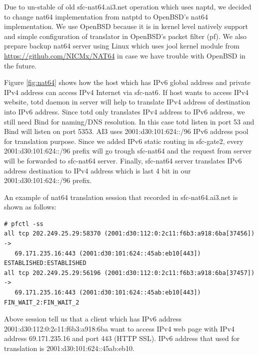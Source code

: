 \documentclass{article}
\begin{document}
Due to un-stable of old sfc-nat64.ai3.net operation which uses naptd, we decided to change nat64 implementation from natptd to OpenBSD's nat64 implementation.  
We use OpenBSD because it is in kernel level natively support and simple configuration of translator in OpenBSD's packet filter (pf).
We also prepare backup nat64 server using Linux which uses jool kernel module from \url{https://github.com/NICMx/NAT64} in case we have trouble with OpenBSD in the future. 

Figure \ref{fig:nat64} shows how the host which has IPv6 global address and private IPv4 address can access IPv4 Internet via sfc-nat6. 
If host wants to access IPv4 website, totd daemon in server will help to translate IPv4 address of destination into IPv6 address. 
Since totd only translates IPv4 address to IPv6 address, we still need Bind for naming/DNS resolution. 
In this case totd listen in port 53 and Bind will listen on port 5353. 
AI3 uses 2001:d30:101:624::/96 IPv6 address pool for translation purpose.  
Since we added IPv6 static routing in sfc-gate2, every 2001:d30:101:624::/96 prefix will go trough sfc-nat64 and the request from server will be forwarded to sfc-nat64 server. 
Finally, sfc-nat64 server translates IPv6 address destination to IPv4 address which is last 4 bit in our  2001:d30:101:624::/96 prefix.   

An example of nat64 translation session that recorded in sfc-nat64.ai3.net is shown as follows:  
\begin{verbatim}
# pfctl -ss     
all tcp 202.249.25.29:58370 (2001:d30:112:0:2c11:f6b3:a918:6ba[37456]) -> 
   69.171.235.16:443 (2001:d30:101:624::45ab:eb10[443]) ESTABLISHED:ESTABLISHED
all tcp 202.249.25.29:56196 (2001:d30:112:0:2c11:f6b3:a918:6ba[37457]) -> 
   69.171.235.16:443 (2001:d30:101:624::45ab:eb10[443]) FIN_WAIT_2:FIN_WAIT_2
\end{verbatim}

Above session tell us that a client which has IPv6 address 2001:d30:112:0:2c11:f6b3:a918:6ba want to access IPv4 web page with IPv4 address 69.171.235.16 and port 443 (HTTP SSL).  
IPv6 address that used for translation is 2001:d30:101:624::45ab:eb10.  
\end{document}
